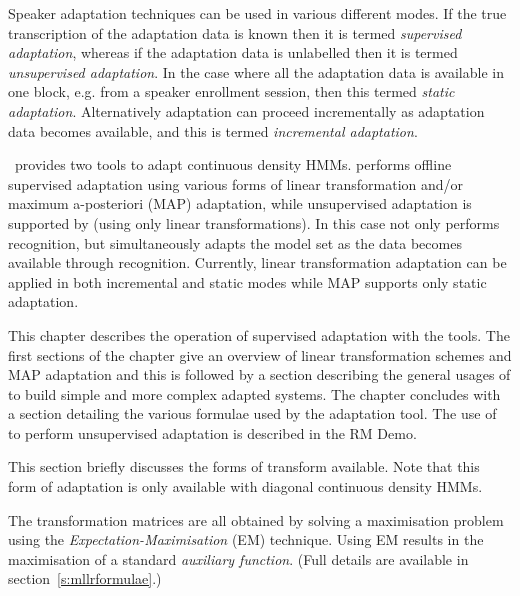 Speaker adaptation techniques can be used in various different
modes. If
the true transcription of the adaptation data is known then
it is termed 
\textit{supervised adaptation}, 
whereas if the adaptation
data is unlabelled then it is termed 
\textit{unsupervised adaptation}.
In the case where all the adaptation data is available in one block,
e.g. from a speaker enrollment session, then this termed \textit{static
adaptation}. Alternatively adaptation can proceed incrementally as
adaptation data becomes available, and this is termed 
\textit{incremental adaptation}.  

\HTK\ provides two tools to adapt continuous density HMMs. 
performs offline supervised adaptation using various forms of linear
transformation and/or maximum a-posteriori (MAP) adaptation, while
unsupervised adaptation is supported by  (using only
linear transformations).  In this case  not only performs
recognition, but simultaneously adapts the model set as the data
becomes available through recognition. Currently, linear
transformation adaptation can be applied in both incremental and
static modes while MAP supports only static adaptation.

This chapter describes the operation of supervised adaptation with the
 tools.  The first sections of the chapter give an
overview of linear transformation schemes and MAP adaptation and this
is followed by a section describing the general usages of
 to build simple and more complex adapted systems. The
chapter concludes with a section detailing the various formulae used
by the adaptation tool.  The use of  to perform
unsupervised adaptation is described in the RM Demo. 



This section briefly discusses the forms of transform available. Note
that this form of adaptation is only available with diagonal
continuous density HMMs.

The transformation matrices are all obtained by solving a maximisation
problem using the \textit{Expectation-Maximisation} (EM)
technique. Using EM results in the maximisation of a standard
\textit{auxiliary function}. (Full details are available in
section~\ref{s:mllrformulae}.)

